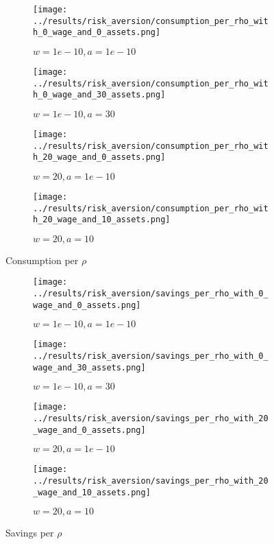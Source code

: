 \documentclass[12pt]{article}
\begin{document}
\begin{figure}[hbt!]

\begin{subfigure}{0.5\textwidth}
\texttt{[image: ../results/risk\_aversion/consumption\_per\_rho\_with\_0\_wage\_and\_0\_assets.png]} \caption{$w=1e-10, a=1e-10$}
\end{subfigure}%
\begin{subfigure}{0.5\textwidth}
\texttt{[image: ../results/risk\_aversion/consumption\_per\_rho\_with\_0\_wage\_and\_30\_assets.png]}
\caption{$w=1e-10, a=30$}
\end{subfigure}

\begin{subfigure}{0.5\textwidth}
\texttt{[image: ../results/risk\_aversion/consumption\_per\_rho\_with\_20\_wage\_and\_0\_assets.png]} \caption{$w=20, a=1e-10$}
\end{subfigure}%
\begin{subfigure}{0.5\textwidth}
\texttt{[image: ../results/risk\_aversion/consumption\_per\_rho\_with\_20\_wage\_and\_10\_assets.png]}
\caption{$w=20, a=10$}
\end{subfigure}

\caption{Consumption per $\rho$}
\label{fig:consumption_per_rho}
\end{figure}


\begin{figure}[hbt!]

\begin{subfigure}{0.5\textwidth}
\texttt{[image: ../results/risk\_aversion/savings\_per\_rho\_with\_0\_wage\_and\_0\_assets.png]} \caption{$w=1e-10, a=1e-10$}
\end{subfigure}%
\begin{subfigure}{0.5\textwidth}
\texttt{[image: ../results/risk\_aversion/savings\_per\_rho\_with\_0\_wage\_and\_30\_assets.png]}
\caption{$w=1e-10, a=30$}
\end{subfigure}

\begin{subfigure}{0.5\textwidth}
\texttt{[image: ../results/risk\_aversion/savings\_per\_rho\_with\_20\_wage\_and\_0\_assets.png]} \caption{$w=20, a=1e-10$}
\end{subfigure}%
\begin{subfigure}{0.5\textwidth}
\texttt{[image: ../results/risk\_aversion/savings\_per\_rho\_with\_20\_wage\_and\_10\_assets.png]}
\caption{$w=20, a=10$}
\end{subfigure}

\caption{Savings per $\rho$}
\label{fig:savings_per_rho}
\end{figure}
\end{document}
